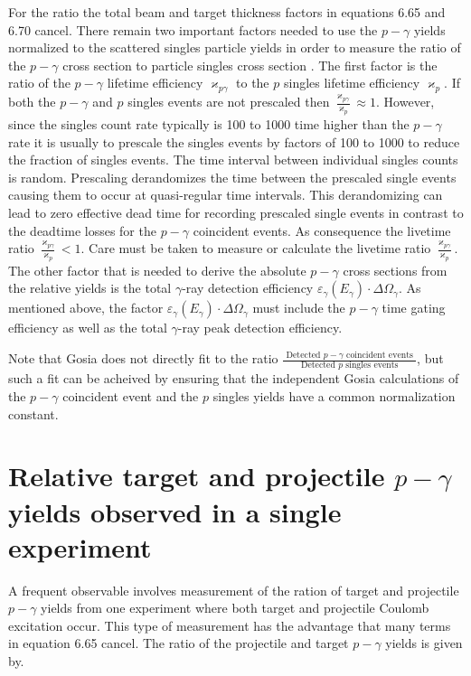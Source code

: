 \documentclass[10pt]{article}
\begin{document}
For the ratio the total beam and target thickness factors in equations 6.65 and 6.70 cancel. There remain two important factors needed to use the $p-\gamma$ yields normalized to the scattered singles particle yields in order to measure the ratio of the $p-\gamma$ cross section to particle singles cross section . The first factor is the ratio of the $p-\gamma$ lifetime efficiency $\varkappa_{p \gamma}$ to the $p$ singles lifetime efficiency $\varkappa_{p}$. If both the $p-\gamma$ and $p$ singles events are not prescaled then $\frac{\varkappa_{p \gamma}}{\varkappa_{p}} \approx 1$. However, since the singles count rate typically is 100 to 1000 time higher than the $p-\gamma$ rate it is usually to prescale the singles events by factors of 100 to 1000 to reduce the fraction of singles events. The time interval between individual singles counts is random. Prescaling derandomizes the time between the prescaled single events causing them to occur at quasi-regular time intervals. This derandomizing can lead to zero effective dead time for recording prescaled single events in contrast to the deadtime losses for the $p-\gamma$ coincident events. As consequence the livetime ratio $\frac{\varkappa_{p \gamma}}{\varkappa_{p}}<1$. Care must be taken to measure or calculate the livetime ratio $\frac{\varkappa_{p \gamma}}{\varkappa_{p}}$. The other factor that is needed to derive the absolute $p-\gamma$ cross sections from the relative yields is the total $\gamma$-ray detection efficiency $\varepsilon_{\gamma}\left(E_{\gamma}\right) \cdot \Delta \Omega_{\gamma}$. As mentioned above, the factor $\varepsilon_{\gamma}\left(E_{\gamma}\right) \cdot \Delta \Omega_{\gamma}$ must include the $p-\gamma$ time gating efficiency as well as the total $\gamma$-ray peak detection efficiency.

Note that Gosia does not directly fit to the ratio $\frac{\text { Detected } p-\gamma \text { coincident events }}{\text { Detected } p \text { singles events }}$, but such a fit can be acheived by ensuring that the independent Gosia calculations of the $p-\gamma$ coincident event and the $p$ singles yields have a common normalization constant.

\section*{Relative target and projectile $p-\gamma$ yields observed in a single experiment}
A frequent observable involves measurement of the ration of target and projectile $p-\gamma$ yields from one experiment where both target and projectile Coulomb excitation occur. This type of measurement has the advantage that many terms in equation 6.65 cancel. The ratio of the projectile and target $p-\gamma$ yields is given by.
\end{document}
